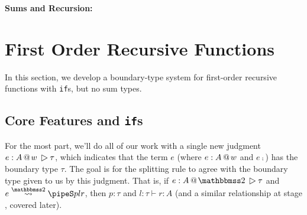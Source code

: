 \documentclass[]{article}
\begin{document}
\begin{abstrsyn}
\begin{framed}
\noindent\textbf{Sums and Recursion:}
\end{framed}


\section{First Order Recursive Functions}
\label{sec:firstorder}

In this section, we develop a boundary-type system for first-order recursive functions
with {\tt if}s, but no sum types.

\subsection {Core Features and {\tt if}s}

For the most part, we'll do all of our work with a single new judgment \mbox{$\btj e A w \tau$}, 
which indicates that the term $e$ (where ${e}:{A}~\hspace{-0.15em}\text{@}\hspace{-0.2em}~w$ and $e \comp$) has the boundary type $\tau$.
The goal is for the splitting rule to agree with the boundary type given to us by this judgment.
That is, if $\btj e A \bbtwo \tau$ and $\splittwo{e}{A}{p}{l}{r}$, 
then $p:\tau$ and $l:\tau \vdash r:A$ (and a similar relationship at stage \bbone, covered later).


\end{abstrsyn}
\end{document}
